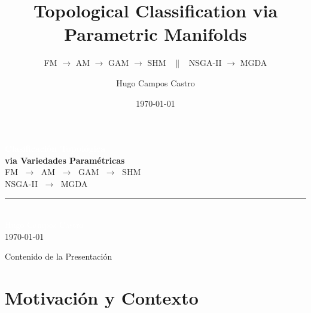 \documentclass[aspectratio=169,10pt]{beamer}
\title[Clasificación Topológica Paramétrica]{%
  Topological Classification via\\Parametric Manifolds}
\subtitle{FM $\to$ AM $\to$ GAM $\to$ SHM \ $\|$ \ NSGA-II $\to$ MGDA}
\author[H. Campos]{Hugo Campos Castro}
\date{\today}
\institute{Departamento de Ciencias de la Computación}
\begin{document}
{
\begin{frame}[plain]
  \vspace{1.5cm}
  \centering
  {\Huge\bfseries\textcolor{white}{Clasificación Topológica}\\[4pt]}
  {\Huge\bfseries\textcolor{accent}{via Variedades Paramétricas}\\[12pt]}
  {\large\textcolor{white!70}{FM $\;\longrightarrow\;$ AM $\;\longrightarrow\;$ GAM $\;\longrightarrow\;$ SHM}}\\[4pt]
  {\large\textcolor{white!70}{NSGA-II $\;\longrightarrow\;$ MGDA}}\\[20pt]
  \rule{8cm}{0.4pt}\\[10pt]
  {\normalsize\textcolor{white}{Hugo Campos Castro}\\[4pt]}
  {\small\textcolor{white!60}{\today}}
\end{frame}
}

\begin{frame}{Contenido de la Presentación}
  \tableofcontents
\end{frame}

\section{Motivación y Contexto}
\end{document}
